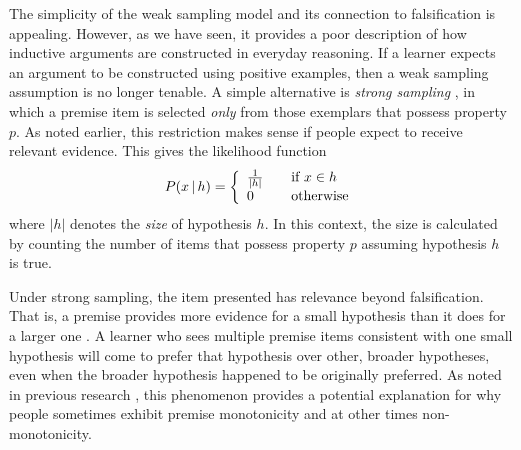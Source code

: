 \documentclass[doc,12pt]{apa}
\newcommand{\given}{\, | \, } %
\begin{document}
The simplicity of the weak sampling model and its connection to falsification is appealing. However, as we have seen, it provides a poor description of how
inductive arguments are constructed in everyday reasoning. If a learner expects an argument to be constructed using positive examples, then a weak sampling assumption is no longer tenable. A simple alternative is {\em strong sampling} \cite{TG01,ST03}, in which a premise item is selected {\it only} from those exemplars that possess property $p$. As noted earlier, this restriction makes sense if people expect to receive relevant evidence.
This gives the likelihood function
\begin{equation}
\label{eqn:strongsampling}
P(x \given h) = \left\{
  \begin{array}{l l}
    \frac{1}{|h|} & \quad \textrm{if $x \in h$} \\
    0 & \quad \textrm{otherwise}
  \end{array} \right.
\end{equation}
where $|h|$ denotes the {\em size} of hypothesis $h$. In this context, the size is calculated by counting the number of items that possess property $p$ assuming hypothesis $h$ is true.

Under strong sampling, the item presented has relevance beyond falsification. That is, a premise provides more evidence for a small hypothesis than it does for a larger one \cite{TG01}. A learner who sees multiple premise items consistent with one small hypothesis will come to prefer that hypothesis over other, broader hypotheses, even when the broader hypothesis happened to be originally preferred.  As noted in previous research \cite{Fer06,KT09,VMS13}, this phenomenon provides a potential explanation for why people sometimes exhibit premise monotonicity and at other times non-monotonicity.
\end{document}
